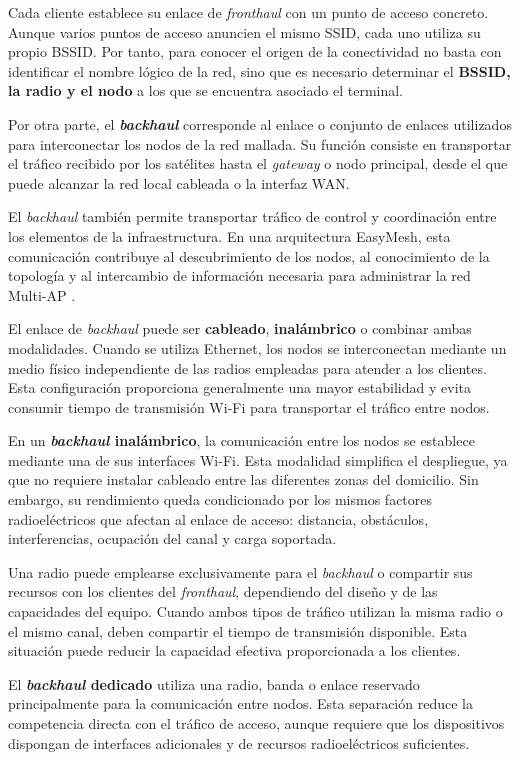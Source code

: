 Cada cliente establece su enlace de \textit{fronthaul} con un punto de
acceso concreto. Aunque varios puntos de acceso anuncien el mismo SSID,
cada uno utiliza su propio BSSID. Por tanto, para conocer el origen de la
conectividad no basta con identificar el nombre lógico de la red, sino
que es necesario determinar el \textbf{BSSID, la radio y el nodo} a los
que se encuentra asociado el terminal.

Por otra parte, el \textbf{\textit{backhaul}} corresponde al enlace o
conjunto de enlaces utilizados para interconectar los nodos de la red
mallada. Su función consiste en transportar el tráfico recibido por los
satélites hasta el \textit{gateway} o nodo principal, desde el que puede
alcanzar la red local cableada o la interfaz WAN.

El \textit{backhaul} también permite transportar tráfico de control y
coordinación entre los elementos de la infraestructura. En una
arquitectura EasyMesh, esta comunicación contribuye al descubrimiento de
los nodos, al conocimiento de la topología y al intercambio de
información necesaria para administrar la red Multi-AP
\cite{wifi_alliance_easymesh,ieee_1905_1}.

El enlace de \textit{backhaul} puede ser
\textbf{cableado}, \textbf{inalámbrico} o combinar ambas modalidades.
Cuando se utiliza Ethernet, los nodos se interconectan mediante un medio
físico independiente de las radios empleadas para atender a los
clientes. Esta configuración proporciona generalmente una mayor
estabilidad y evita consumir tiempo de transmisión Wi-Fi para transportar
el tráfico entre nodos.

En un \textbf{\textit{backhaul} inalámbrico}, la comunicación entre los
nodos se establece mediante una de sus interfaces Wi-Fi. Esta modalidad
simplifica el despliegue, ya que no requiere instalar cableado entre las
diferentes zonas del domicilio. Sin embargo, su rendimiento queda
condicionado por los mismos factores radioeléctricos que afectan al
enlace de acceso: distancia, obstáculos, interferencias, ocupación del
canal y carga soportada.

Una radio puede emplearse exclusivamente para el
\textit{backhaul} o compartir sus recursos con los clientes del
\textit{fronthaul}, dependiendo del diseño y de las capacidades del
equipo. Cuando ambos tipos de tráfico utilizan la misma radio o el mismo
canal, deben compartir el tiempo de transmisión disponible. Esta
situación puede reducir la capacidad efectiva proporcionada a los
clientes.

El \textbf{\textit{backhaul} dedicado} utiliza una radio, banda o enlace
reservado principalmente para la comunicación entre nodos. Esta
separación reduce la competencia directa con el tráfico de acceso,
aunque requiere que los dispositivos dispongan de interfaces adicionales
y de recursos radioeléctricos suficientes.

